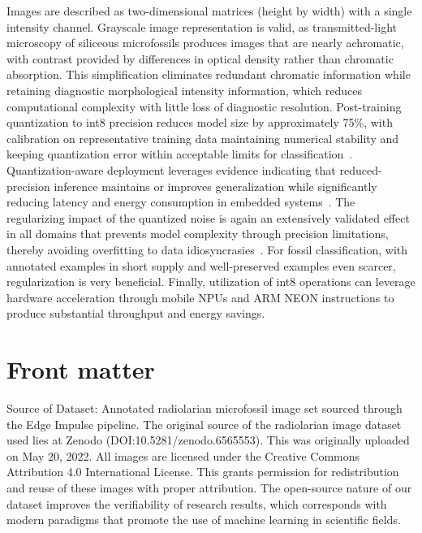 \documentclass[a4paper,fleqn]{cas-sc}
\begin{document}
Images are described as two-dimensional matrices (height by width) with a single intensity channel. Grayscale image representation is valid, as transmitted-light microscopy of siliceous microfossils produces images that are nearly achromatic, with contrast provided by differences in optical density rather than chromatic absorption. This simplification eliminates redundant chromatic information while retaining diagnostic morphological intensity information, which reduces computational complexity with little loss of diagnostic resolution. Post-training quantization to int8 precision reduces model size by approximately 75\%, with calibration on representative training data maintaining numerical stability and keeping quantization error within acceptable limits for classification~\cite{edgeimpulse2023}. Quantization-aware deployment leverages evidence indicating that reduced-precision inference maintains or improves generalization while significantly reducing latency and energy consumption in embedded systems~\cite{yaqoob2024tinyml}. The regularizing impact of the quantized noise is again an extensively validated effect in all domains that prevents model complexity through precision limitations, thereby avoiding overfitting to data idiosyncrasies~\cite{yaqoob2024tinyml}. For fossil classification, with annotated examples in short supply and well-preserved examples even scarcer, regularization is very beneficial. Finally, utilization of int8 operations can leverage hardware acceleration through mobile NPUs and ARM NEON instructions to produce substantial throughput and energy savings.

\FloatBarrier

\section{Front matter}

Source of Dataset: Annotated radiolarian microfossil image set sourced through the Edge Impulse pipeline. The original source of the radiolarian image dataset used lies at Zenodo (DOI:10.5281/zenodo.6565553). This was originally uploaded on May 20, 2022. All images are licensed under the Creative Commons Attribution 4.0 International License. This grants permission for redistribution and reuse of these images with proper attribution. The open-source nature of our dataset improves the verifiability of research results, which corresponds with modern paradigms that promote the use of machine learning in scientific fields.
\end{document}

